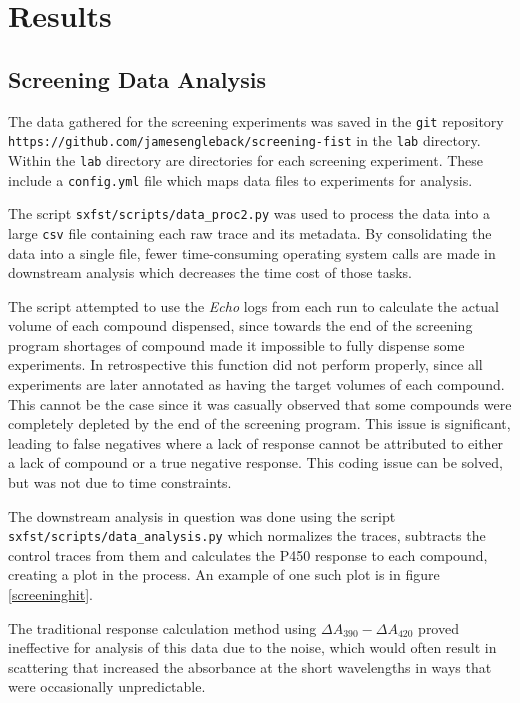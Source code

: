 \documentclass{article}
\begin{document}
%


\section{Results}
\subsection{Screening Data Analysis}

The data gathered for the screening experiments was saved in the \texttt{git} repository  \texttt{https://github.com/jamesengleback/screening-fist} in the \texttt{lab} directory.
Within the \texttt{lab} directory are directories for each screening experiment.
These include a \texttt{config.yml} file which maps data files to experiments for analysis.
\par
The script \texttt{sxfst/scripts/data\_proc2.py} was used to process the data into a large \texttt{csv} file containing each raw trace and its metadata.
By consolidating the data into a single file, fewer time-consuming operating system calls are made in downstream analysis which decreases the time cost of those tasks.

The script attempted to use the \textit{Echo} logs from each run to calculate the actual volume of each compound dispensed, since towards the end of the screening program shortages of compound made it impossible to fully dispense some experiments.
In retrospective this function did not perform properly, since all experiments are later annotated as having the target volumes of each compound.
This cannot be the case since it was casually observed that some compounds were completely depleted by the end of the screening program.
This issue is significant, leading to false negatives where a lack of response cannot be attributed to either a lack of compound or a true negative response.
This coding issue can be solved, but was not due to time constraints.

The downstream analysis in question was done using the script \texttt{sxfst/scripts/data\_analysis.py} which normalizes the traces, subtracts the control traces from them and calculates the P450 response to each compound, creating a plot in the process.
An example of one such plot is in figure \ref{screeninghit}.

The traditional response calculation method using $\Delta A_{390} - \Delta A_{420}$ proved ineffective for analysis of this data due to the noise, which would often result in scattering that increased the absorbance at the short wavelengths in ways that were occasionally unpredictable.
\end{document}
